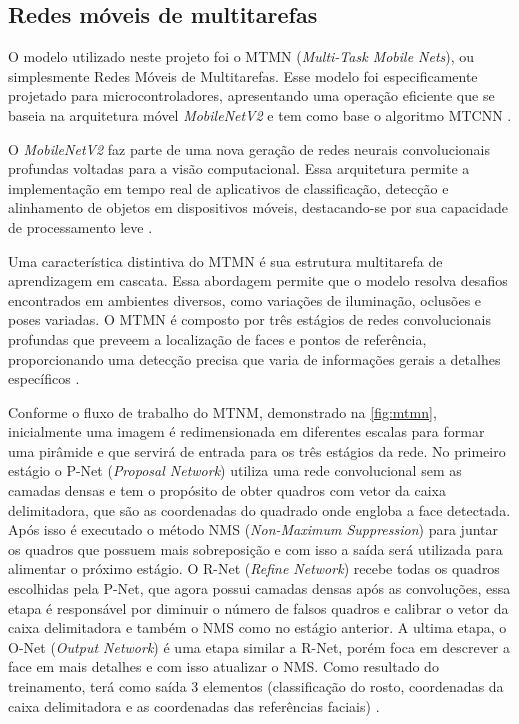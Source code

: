 \subsection{Redes móveis de multitarefas}\label{subsec:multmobile}

O modelo utilizado neste projeto foi o MTMN (\textit{Multi-Task Mobile Nets}), ou 
simplesmente Redes Móveis de Multitarefas. Esse modelo foi especificamente 
projetado para microcontroladores, apresentando uma operação 
eficiente que se baseia na arquitetura móvel \textit{MobileNetV2} e tem 
como base o algoritmo MTCNN \cite{mtmnimg}.

O \textit{MobileNetV2} faz parte de uma nova geração de redes 
neurais convolucionais profundas voltadas para a 
visão computacional. Essa arquitetura permite a 
implementação em tempo real de aplicativos de 
classificação, detecção e alinhamento de objetos 
em dispositivos móveis, destacando-se por 
sua capacidade de processamento leve \cite{luna2022}.

Uma característica distintiva do MTMN é sua estrutura 
multitarefa de aprendizagem em cascata. Essa abordagem 
permite que o modelo resolva desafios encontrados em 
ambientes diversos, como variações de iluminação, 
oclusões e poses variadas. O MTMN é composto por três 
estágios de redes convolucionais profundas que preveem a 
localização de faces e pontos de referência, proporcionando 
uma detecção precisa que varia de informações gerais a 
detalhes específicos \cite{luna2022}.

Conforme o fluxo de trabalho do MTNM, demonstrado na \autoref{fig:mtmn}, 
inicialmente uma imagem é redimensionada em diferentes escalas para formar uma pirâmide e que 
servirá de entrada para os três estágios da rede. No primeiro estágio o P-Net (\textit{Proposal Network}) 
utiliza uma rede convolucional sem as camadas densas e tem o propósito de obter quadros com 
vetor da caixa delimitadora, que são as coordenadas do quadrado onde engloba a face detectada. 
Após isso é executado o método NMS (\textit{Non-Maximum Suppression}) para juntar os quadros que 
possuem mais sobreposição e com isso a saída será utilizada para alimentar o próximo estágio. O R-Net 
(\textit{Refine Network}) recebe todas os quadros escolhidas pela P-Net, que agora possui camadas 
densas após as convoluções, essa etapa é responsável por diminuir o número de falsos quadros 
e calibrar o vetor da caixa delimitadora e também o NMS como no estágio anterior. A ultima etapa, 
o O-Net (\textit{Output Network}) é uma etapa similar a R-Net, porém foca em descrever a face em 
mais detalhes e com isso atualizar o NMS. Como resultado do treinamento, terá como 
saída 3 elementos (classificação do rosto, coordenadas da caixa delimitadora e as 
coordenadas das referências faciais) \cite{zhang2016}.


